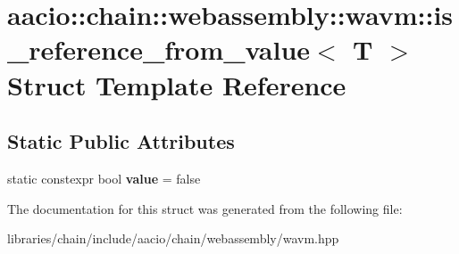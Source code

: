 \hypertarget{structaacio_1_1chain_1_1webassembly_1_1wavm_1_1is__reference__from__value}{}\section{aacio\+:\+:chain\+:\+:webassembly\+:\+:wavm\+:\+:is\+\_\+reference\+\_\+from\+\_\+value$<$ T $>$ Struct Template Reference}
\label{structaacio_1_1chain_1_1webassembly_1_1wavm_1_1is__reference__from__value}
\subsection*{Static Public Attributes}
\begin{DoxyCompactItemize}
\item 
\mbox{\label{structaacio_1_1chain_1_1webassembly_1_1wavm_1_1is__reference__from__value_aade6f4c23eab906dd31114fe61ce5c42}} 
static constexpr bool {\bfseries value} = false
\end{DoxyCompactItemize}


The documentation for this struct was generated from the following file\+:\begin{DoxyCompactItemize}
\item 
libraries/chain/include/aacio/chain/webassembly/wavm.\+hpp\end{DoxyCompactItemize}
